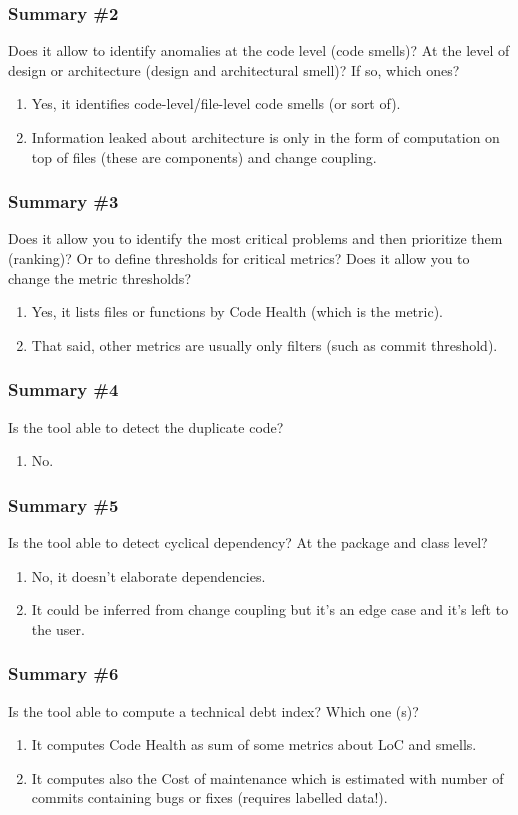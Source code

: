 \documentclass{beamer}
\begin{document}
\begin{frame}
  \frametitle{Summary \#2}
  Does it allow to identify anomalies at the code level (code smells)? At the level of design or architecture (design and architectural smell)? If so, which ones?
  \begin{enumerate}
    \item Yes, it identifies code-level/file-level code smells (or sort of).
    \item Information leaked about architecture is only in the form of computation on top of files (these are components) and change coupling.
  \end{enumerate}
\end{frame}

\begin{frame}
  \frametitle{Summary \#3}
  Does it allow you to identify the most critical problems and then prioritize them (ranking)? Or to define thresholds for critical metrics? Does it allow you to change the metric thresholds?
  \begin{enumerate}
    \item Yes, it lists files or functions by Code Health (which is the metric).
    \item That said, other metrics are usually only filters (such as commit threshold).
  \end{enumerate}
\end{frame}

\begin{frame}
  \frametitle{Summary \#4}
  Is the tool able to detect the duplicate code?
  \begin{enumerate}
    \item No.
  \end{enumerate}
\end{frame}

\begin{frame}
  \frametitle{Summary \#5}
  Is the tool able to detect cyclical dependency? At the package and class level?
  \begin{enumerate}
    \item No, it doesn't elaborate dependencies.
    \item It could be inferred from change coupling but it's an edge case and it's left to the user.
  \end{enumerate}
\end{frame}

\begin{frame}
  \frametitle{Summary \#6}
  Is the tool able to compute a technical debt index? Which one (s)?
\begin{enumerate}
  \item It computes Code Health as sum of some metrics about LoC and smells.
  \item It computes also the Cost of maintenance which is estimated with number of commits containing bugs or fixes (requires labelled data!).
\end{enumerate}
\end{frame}
\end{document}
